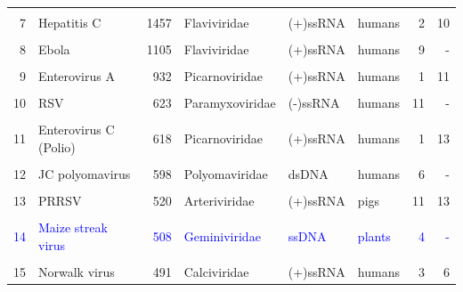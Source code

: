 \documentclass[landscape]{slides}
\begin{document}
\begin{slide}
\begin{center}
\begin{tabular}{r|l|r|l|l|l|r|r}
       &                    &              &                &          &        &       &          \\ 
     7 & Hepatitis C        &        1457  & Flaviviridae   & (+)ssRNA & humans &     2 &      10  \\
       &                    &              &                &          &        &       &          \\ 
     8 & Ebola              &        1105  & Flaviviridae   & (+)ssRNA & humans &     9 &       -  \\
       &                    &              &                &          &        &       &          \\ 
     9 & Enterovirus A      &         932  & Picarnoviridae & (+)ssRNA & humans &     1 &      11  \\
       &                    &              &                &          &        &       &          \\ 
    10 & RSV                &         623  & Paramyxoviridae& (-)ssRNA & humans &    11 &       -  \\
       &                    &              &                &          &        &       &          \\ 
    11 & Enterovirus C (Polio) &      618  & Picarnoviridae & (+)ssRNA & humans &     1 &      13  \\
       &                    &              &                &          &        &       &          \\ 
    12 & JC polyomavirus    &          598 & Polyomaviridae & dsDNA    & humans &     6 &       -  \\
       &                    &              &                &          &        &       &          \\ 
    13 & PRRSV              &          520 & Arteriviridae  & (+)ssRNA & pigs   &    11 &      13  \\ %
       &                    &              &                &          &        &       &          \\ 
    \textcolor{blue}{14} & \textcolor{blue}{Maize streak virus} &          \textcolor{blue}{508} & \textcolor{blue}{Geminiviridae}  & \textcolor{blue}{ssDNA}    & \textcolor{blue}{plants} &     \textcolor{blue}{4} &      \textcolor{blue}{-}   \\
       &                    &              &                &          &        &       &          \\ 
    15 & Norwalk virus      &          491 &  Calciviridae  & (+)ssRNA & humans &     3 &       6  \\ 
\end{tabular}

\end{center}

\tiny
{}
\vfill
\end{slide}
\end{document}
